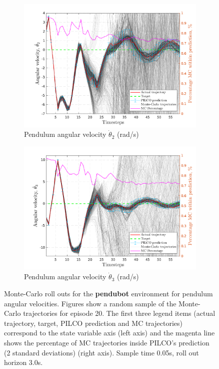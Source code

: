  \begin{figure}[H]    
    \begin{subfigure}[b]{1\linewidth}
    \centering
    \includegraphics[height=0.4\textheight,width=1\textwidth]{Chapter3/Figures/pen_MC_rollout_Ep_40_Dim_1.png} 
    \caption{Pendulum angular velocity $\dot \theta_{2}$ (rad/s)} 
    \label{Fig:Re-pen-cart-position} 
  \end{subfigure} 
  \hspace{\fill}  %
  \begin{subfigure}[b]{1\linewidth}
    \centering
    \includegraphics[height=0.4\textheight,width=1\textwidth]{Chapter3/Figures/pen_MC_rollout_Ep_40_Dim_2.png} 
    \caption{Pendulum angular velocity $\dot \theta_{3}$ (rad/s)} 
    \label{Fig:Re-pen-cart-velocity} 
  \end{subfigure} 
\caption[Monte-Carlo roll outs for \textbf{pendubot} pendulum angular velocities]{Monte-Carlo roll outs for the \textbf{pendubot} environment for pendulum angular velocities. Figures show a random sample of the Monte-Carlo trajectories for episode 20. The first three legend items (actual trajectory, target, PILCO prediction and MC trajectories) correspond to the state variable axis (left axis) and the magenta line shows the percentage of MC trajectories inside PILCO's prediction (2 standard deviations) (right axis). Sample time 0.05s, roll out horizon 3.0s.}
\label{Fig:Re-pen-MC-roll-outs-1} 
\end{figure}
 
